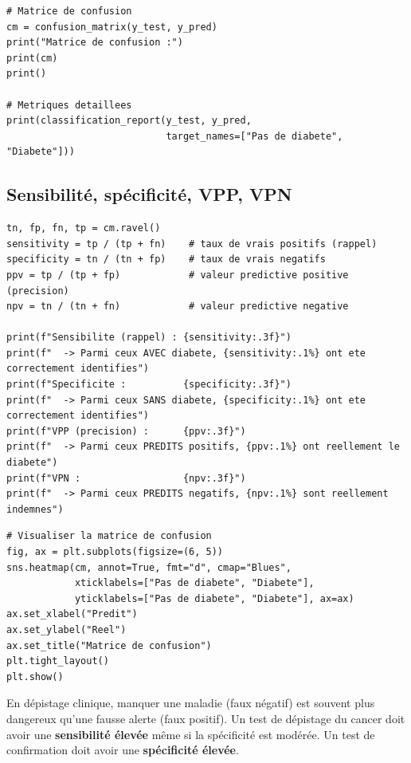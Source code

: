 \begin{verbatim}
# Matrice de confusion
cm = confusion_matrix(y_test, y_pred)
print("Matrice de confusion :")
print(cm)
print()

# Metriques detaillees
print(classification_report(y_test, y_pred,
                            target_names=["Pas de diabete", "Diabete"]))
\end{verbatim}

\subsection{Sensibilit\'e, sp\'ecificit\'e, VPP, VPN}

\begin{verbatim}
tn, fp, fn, tp = cm.ravel()
sensitivity = tp / (tp + fn)    # taux de vrais positifs (rappel)
specificity = tn / (tn + fp)    # taux de vrais negatifs
ppv = tp / (tp + fp)            # valeur predictive positive (precision)
npv = tn / (tn + fn)            # valeur predictive negative

print(f"Sensibilite (rappel) : {sensitivity:.3f}")
print(f"  -> Parmi ceux AVEC diabete, {sensitivity:.1%} ont ete correctement identifies")
print(f"Specificite :          {specificity:.3f}")
print(f"  -> Parmi ceux SANS diabete, {specificity:.1%} ont ete correctement identifies")
print(f"VPP (precision) :      {ppv:.3f}")
print(f"  -> Parmi ceux PREDITS positifs, {ppv:.1%} ont reellement le diabete")
print(f"VPN :                  {npv:.3f}")
print(f"  -> Parmi ceux PREDITS negatifs, {npv:.1%} sont reellement indemnes")
\end{verbatim}

\begin{verbatim}
# Visualiser la matrice de confusion
fig, ax = plt.subplots(figsize=(6, 5))
sns.heatmap(cm, annot=True, fmt="d", cmap="Blues",
            xticklabels=["Pas de diabete", "Diabete"],
            yticklabels=["Pas de diabete", "Diabete"], ax=ax)
ax.set_xlabel("Predit")
ax.set_ylabel("Reel")
ax.set_title("Matrice de confusion")
plt.tight_layout()
plt.show()
\end{verbatim}

\begin{warningbox}
En d\'epistage clinique, manquer une maladie (faux n\'egatif) est souvent plus dangereux qu'une fausse alerte (faux positif). Un test de d\'epistage du cancer doit avoir une \textbf{sensibilit\'e \'elev\'ee} m\^eme si la sp\'ecificit\'e est mod\'er\'ee. Un test de confirmation doit avoir une \textbf{sp\'ecificit\'e \'elev\'ee}.
\end{warningbox}

